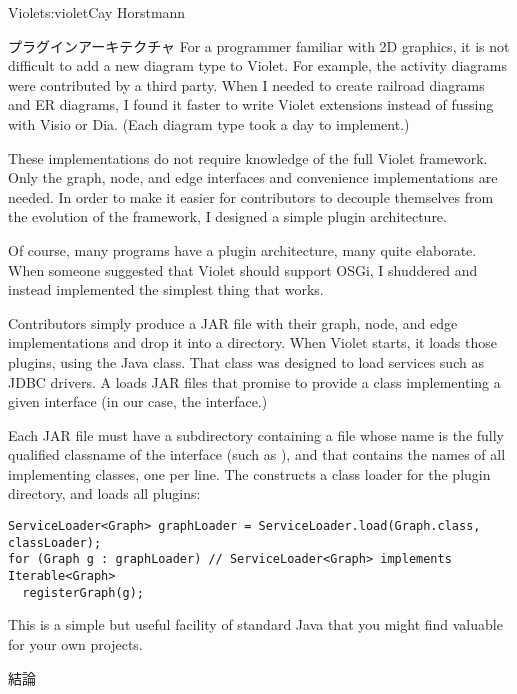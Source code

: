 \begin{aosachapter}{Violet}{s:violet}{Cay Horstmann}
\begin{aosasect1}{プラグインアーキテクチャ}
For a programmer familiar with 2D graphics, it is not difficult to add
a new diagram type to Violet. For example, the activity diagrams were
contributed by a third party. When I needed to create railroad
diagrams and ER diagrams, I found it faster to write Violet extensions
instead of fussing with Visio or Dia. (Each diagram type took a day to
implement.)

These implementations do not require knowledge of the full Violet
framework.  Only the graph, node, and edge interfaces and convenience
implementations are needed. In order to make it easier for
contributors to decouple themselves from the evolution of the
framework, I designed a simple plugin architecture.

Of course, many programs have a plugin architecture, many quite
elaborate.  When someone suggested that Violet should support OSGi, I
shuddered and instead implemented the simplest thing that works.

Contributors simply produce a JAR file with their graph, node, and
edge implementations and drop it into a  directory. When
Violet starts, it loads those plugins, using the Java
 class. That class was designed to load services
such as JDBC drivers. A  loads JAR files that
promise to provide a class implementing a given interface (in our
case, the  interface.)

Each JAR file must have a subdirectory 
containing a file whose name is the fully qualified classname of the
interface (such as ), and that
contains the names of all implementing classes, one per line.
The  constructs a class loader for the plugin
directory, and loads all plugins:

\begin{verbatim}
ServiceLoader<Graph> graphLoader = ServiceLoader.load(Graph.class, classLoader);
for (Graph g : graphLoader) // ServiceLoader<Graph> implements Iterable<Graph>
  registerGraph(g); 
\end{verbatim}

This is a simple but useful facility of standard Java that you might
find valuable for your own projects.

\end{aosasect1}

\begin{aosasect1}{結論}


\end{aosasect1}
\end{aosachapter}
